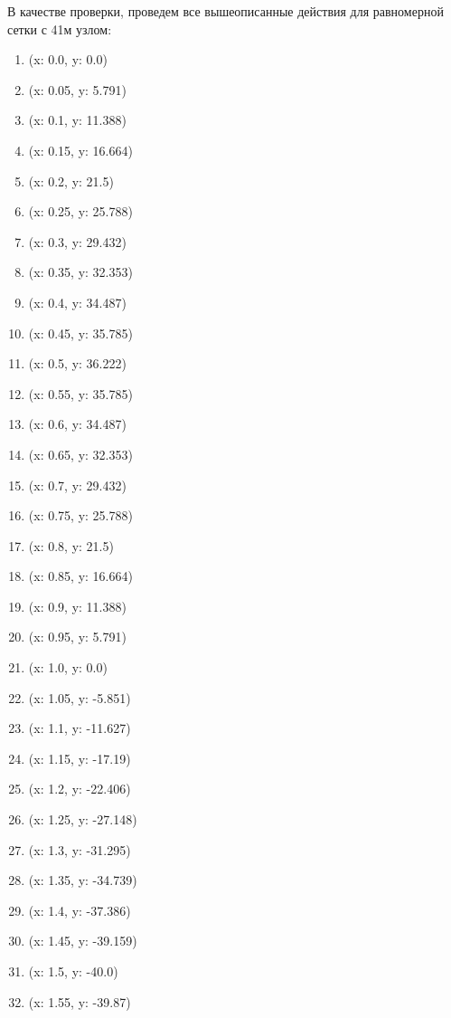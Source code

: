 \documentclass[a4paper, 14pt]{extarticle}
\begin{document}
В качестве проверки, проведем все вышеописанные действия для равномерной сетки с 
41м узлом:

\begin{multicols}{3}
    \begin{enumerate}[itemsep=5pt]
        \item (x: 0.0, y: 0.0)
        \item (x: 0.05, y: 5.791)
        \item (x: 0.1, y: 11.388)
        \item (x: 0.15, y: 16.664)
        \item (x: 0.2, y: 21.5)
        \item (x: 0.25, y: 25.788)
        \item (x: 0.3, y: 29.432)
        \item (x: 0.35, y: 32.353)
        \item (x: 0.4, y: 34.487)
        \item (x: 0.45, y: 35.785)
        \item (x: 0.5, y: 36.222)
        \item (x: 0.55, y: 35.785)
        \item (x: 0.6, y: 34.487)
        \item (x: 0.65, y: 32.353)
        \item (x: 0.7, y: 29.432)
        \item (x: 0.75, y: 25.788)
        \item (x: 0.8, y: 21.5)
        \item (x: 0.85, y: 16.664)
        \item (x: 0.9, y: 11.388)
        \item (x: 0.95, y: 5.791)
        \item (x: 1.0, y: 0.0)
        \item (x: 1.05, y: -5.851)
        \item (x: 1.1, y: -11.627)
        \item (x: 1.15, y: -17.19)
        \item (x: 1.2, y: -22.406)
        \item (x: 1.25, y: -27.148)
        \item (x: 1.3, y: -31.295)
        \item (x: 1.35, y: -34.739)
        \item (x: 1.4, y: -37.386)
        \item (x: 1.45, y: -39.159)
        \item (x: 1.5, y: -40.0)
        \item (x: 1.55, y: -39.87)

\end{enumerate}
\end{multicols}
\end{document}

